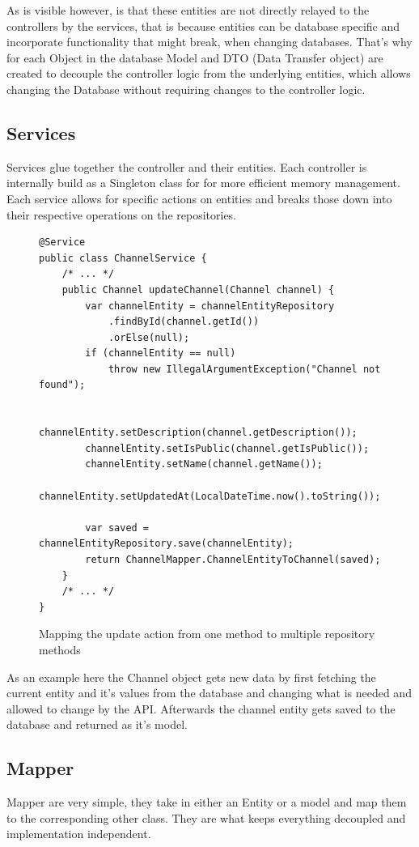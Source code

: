 \documentclass[a4paper,12pt]{article}
\begin{document}
	As is visible however, is that these entities are not directly relayed to the controllers by the services, that
	is because entities can be database specific and incorporate functionality that might break, when changing
	databases. That's why for each Object in the database Model and DTO (Data Transfer object) are created
	to decouple the controller logic from the underlying entities, which allows changing the Database without
	requiring changes to the controller logic.

	\subsection*{Services}
	Services glue together the controller and their entities. Each controller is internally build as a Singleton
	class for for more efficient memory management. Each service allows for specific actions on entities and breaks
	those down into their respective operations on the repositories.
	\begin{figure}[ht!]
		\begin{lstlisting}
@Service
public class ChannelService {
	/* ... */
	public Channel updateChannel(Channel channel) {
		var channelEntity = channelEntityRepository
			.findById(channel.getId())
			.orElse(null);
		if (channelEntity == null) 
			throw new IllegalArgumentException("Channel not found");

		channelEntity.setDescription(channel.getDescription());
		channelEntity.setIsPublic(channel.getIsPublic());
		channelEntity.setName(channel.getName());
		channelEntity.setUpdatedAt(LocalDateTime.now().toString());

		var saved = channelEntityRepository.save(channelEntity);
		return ChannelMapper.ChannelEntityToChannel(saved);
	}
	/* ... */
}
		\end{lstlisting}
		\caption{Mapping the update action from one method to multiple repository methods}
	\end{figure}
	As an example here the Channel object gets new data by first fetching the current entity and it's values from 
	the database and changing what is needed and allowed to change by the API. Afterwards the channel entity gets
	saved to the database and returned as it's model.
	\subsection*{Mapper}
	Mapper are very simple, they take in either an Entity or a model and map them to the corresponding other class.
	They are what keeps everything decoupled and implementation independent.
\end{document}
